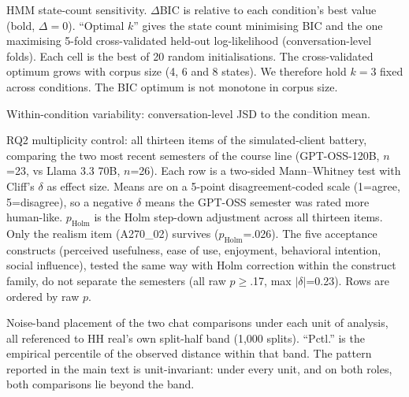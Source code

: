 \documentclass[fleqn,10pt]{JLA_article}
\newcommand{\fitwidth}[1]{\resizebox{\ifdim\width>\linewidth \linewidth\else \width\fi}{!}{#1}}
\begin{document}
\begin{table}[t]
\caption{HMM state-count sensitivity. $\Delta$BIC is relative to each condition's best value (bold, $\Delta=0$). ``Optimal $k$'' gives the state count minimising BIC and the one maximising 5-fold cross-validated held-out log-likelihood (conversation-level folds). Each cell is the best of 20 random initialisations. The cross-validated optimum grows with corpus size (4, 6 and 8 states). We therefore hold $k=3$ fixed across conditions. The BIC optimum is not monotone in corpus size.}
\label{Stab:hmm-modelsel}
\centering
\footnotesize
\setlength{\tabcolsep}{4pt}
\fitwidth{}
\end{table}

\begin{table}[t]
\caption{Within-condition variability: conversation-level JSD to the condition mean.}
\label{Stab:within}
\centering
\footnotesize
\setlength{\tabcolsep}{4pt}
\fitwidth{}
\end{table}

\begin{table}[t]
\caption{RQ2 multiplicity control: all thirteen items of the simulated-client battery, comparing the two most recent semesters of the course line (GPT-OSS-120B, $n$=23, vs Llama 3.3 70B, $n$=26). Each row is a two-sided Mann--Whitney test with Cliff's $\delta$ as effect size. Means are on a 5-point disagreement-coded scale (1=agree, 5=disagree), so a negative $\delta$ means the GPT-OSS semester was rated more human-like. $p_{\text{Holm}}$ is the Holm step-down adjustment across all thirteen items. Only the realism item (A270\_02) survives ($p_{\text{Holm}}$=.026). The five acceptance constructs (perceived usefulness, ease of use, enjoyment, behavioral intention, social influence), tested the same way with Holm correction within the construct family, do not separate the semesters (all raw $p\geq$.17, max $|\delta|$=0.23). Rows are ordered by raw $p$.}
\label{Stab:tam-multiplicity}
\centering
\scriptsize
\setlength{\tabcolsep}{3pt}
\fitwidth{}
\end{table}

\begin{table}[t]
\caption{Noise-band placement of the two chat comparisons under each unit of analysis, all referenced to HH real's own split-half band (1{,}000 splits). ``Pctl.'' is the empirical percentile of the observed distance within that band. The pattern reported in the main text is unit-invariant: under every unit, and on both roles, both comparisons lie beyond the band.}
\label{Stab:unit-noise-band}
\centering
\footnotesize
\setlength{\tabcolsep}{4pt}
\fitwidth{}
\end{table}
\end{document}
